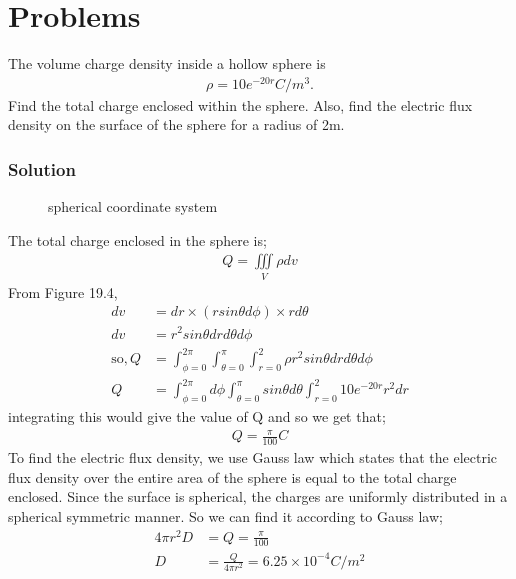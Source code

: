 \section{Problems}
\begin{exmp}
The volume charge density inside a hollow sphere is 
\begin{align*}
\rho=10e^{-20r} C/m^{3}.
\end{align*}
Find the total charge enclosed within the sphere. Also, find the electric flux density on the surface of the sphere for a radius of 2m.

\subsubsection*{Solution}
\begin{figure}[h]
\centering
\caption{spherical coordinate system}
\end{figure} 

The total charge enclosed in the sphere is;
\begin{align*}
Q=\iiint\limits_V\rho dv
\end{align*}
From Figure 19.4, 
\begin{align*}
dv &= dr\times(rsin\theta d\phi)\times rd\theta \\
dv&=r^{2}sin\theta drd\theta d\phi\\
\text{so}, Q&=\int^{2\pi}_{\phi=0}\int^{\pi}_{\theta=0}\int^{2}_{r=0} \rho r^{2}sin\theta drd\theta d\phi\\
Q&= \int^{2\pi}_{\phi=0}d\phi\int^{\pi}_{\theta=0}sin\theta d\theta\int^{2}_{r=0}10e^{-20r}r^{2}dr
\end{align*}
integrating this would give the value of Q and so we get that;
\begin{align*}
Q=\frac{\pi}{100} C
\end{align*}
To find the electric flux density, we use Gauss law which states that the electric flux density over the entire area of the sphere is equal to the total charge enclosed. Since the surface is spherical, the charges are uniformly distributed in a spherical symmetric manner. So we can find it according to Gauss law;
\begin{align*}
4\pi r^{2}D&=Q=\frac{\pi}{100}\\
D&=\frac{Q}{4\pi r^{2}}= 6.25\times10^{-4} C/m^{2}
\end{align*}
\end{exmp}

